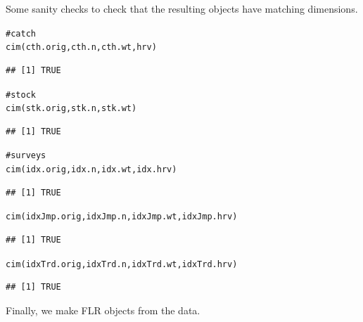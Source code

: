 \documentclass[a4paper,english,10pt]{article}\usepackage[]{graphicx}\usepackage[]{color}
\makeatletter
\newcommand{\hlcom}[1]{\textcolor[rgb]{0.2,0.267,0.4}{#1}}%
\newcommand{\hlstd}[1]{\textcolor[rgb]{0,0,0}{#1}}%
\newcommand{\hlkwd}[1]{\textcolor[rgb]{0.361,0.506,0.596}{#1}}%
\newenvironment{kframe}{%
 \def\at@end@of@kframe{}%
 \ifinner\ifhmode%
  \def\at@end@of@kframe{\end{minipage}}%
  \begin{minipage}{\columnwidth}%
 \fi\fi%
 \def\FrameCommand##1{\hskip\@totalleftmargin \hskip-\fboxsep
 \colorbox{shadecolor}{##1}\hskip-\fboxsep
     \hskip-\linewidth \hskip-\@totalleftmargin \hskip\columnwidth}%
 \MakeFramed {\advance\hsize-\width
   \@totalleftmargin\z@ \linewidth\hsize
   \@setminipage}}%
 {\par\unskip\endMakeFramed%
 \at@end@of@kframe}
\newenvironment{knitrout}{}{} %
\makeatother
\begin{document}
Some sanity checks to check that the resulting objects have matching dimensions.

\begin{knitrout}
\color{fgcolor}\begin{kframe}
\begin{alltt}
\hlcom{# catch}
\hlkwd{cim}\hlstd{(cth.orig, cth.n, cth.wt, hrv)}
\end{alltt}
\begin{verbatim}
## [1] TRUE
\end{verbatim}
\begin{alltt}
\hlcom{# stock}
\hlkwd{cim}\hlstd{(stk.orig, stk.n, stk.wt)}
\end{alltt}
\begin{verbatim}
## [1] TRUE
\end{verbatim}
\begin{alltt}
\hlcom{# surveys}
\hlkwd{cim}\hlstd{(idx.orig, idx.n, idx.wt, idx.hrv)}
\end{alltt}
\begin{verbatim}
## [1] TRUE
\end{verbatim}
\begin{alltt}
\hlkwd{cim}\hlstd{(idxJmp.orig, idxJmp.n, idxJmp.wt, idxJmp.hrv)}
\end{alltt}
\begin{verbatim}
## [1] TRUE
\end{verbatim}
\begin{alltt}
\hlkwd{cim}\hlstd{(idxTrd.orig, idxTrd.n, idxTrd.wt, idxTrd.hrv)}
\end{alltt}
\begin{verbatim}
## [1] TRUE
\end{verbatim}
\end{kframe}
\end{knitrout}





Finally, we make FLR objects from the data.
\end{document}
